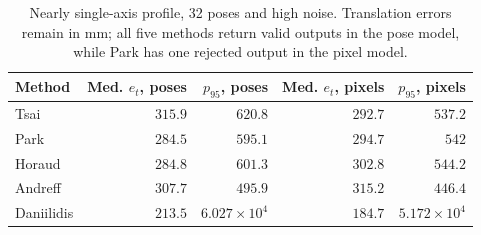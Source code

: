 \begin{table}[!htbp]\centering\footnotesize\setlength{\tabcolsep}{4pt}
\caption{Nearly single-axis profile, 32 poses and high noise. Translation errors remain in mm; all five methods return valid outputs in the pose model, while Park has one rejected output in the pixel model.}\label{tab:axis-tails}
\begin{tabular}{lrrrr}
\toprule
Method & Med. $e_t$, poses & $p_{95}$, poses & Med. $e_t$, pixels & $p_{95}$, pixels \\
\midrule
Tsai & $315.9$ & $620.8$ & $292.7$ & $537.2$ \\
Park & $284.5$ & $595.1$ & $294.7$ & $542$ \\
Horaud & $284.8$ & $601.3$ & $302.8$ & $544.2$ \\
Andreff & $307.7$ & $495.9$ & $315.2$ & $446.4$ \\
Daniilidis & $213.5$ & $6.027\times10^{4}$ & $184.7$ & $5.172\times10^{4}$ \\
\bottomrule
\end{tabular}
\end{table}
